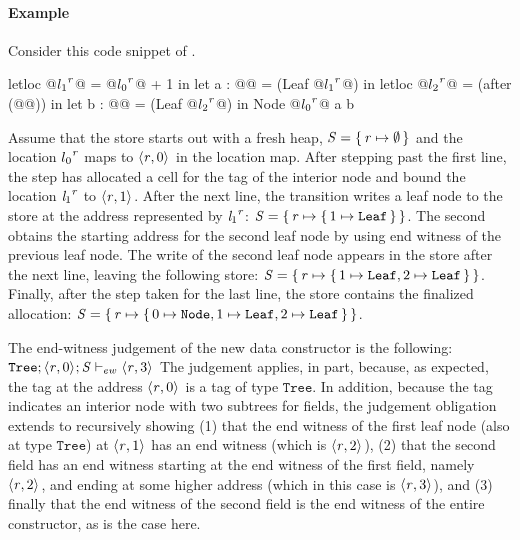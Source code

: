 \paragraph{Example} %
%
Consider this code snippet of \ourcalc{}.
%
\begin{code}
letloc @${l_1}^{\mathit{r}}$@ = @${l_0}^{\mathit{r}}$@ + 1 in
let a : @@ = (Leaf @${l_1}^{\mathit{r}}$@) in
letloc @${l_2}^{\mathit{r}}$@ = (after (@@)) in
let b : @@ = (Leaf @${l_2}^{\mathit{r}}$@) in
Node @${l_0}^{\mathit{r}}$@ a b
\end{code}
%
Assume that the store starts out with a fresh heap, $\mathit{S} = \{ \, \mathit{r}
  \mapsto \emptyset \,\}$ and the location ${l_0}^{\mathit{r}}$ maps to
$\langle \mathit{r}, 0 \rangle ^{}$ in the location map.
%
After stepping past the first line, the \textsc{\dletloctag{}} step has
allocated a cell for the tag of the interior node and bound the
location ${\mathit{l}_1}^{\mathit{r}}$ to $\langle \mathit{r}, 1 \rangle ^{}$.
%
After the next line, the \textsc{\ddatacon{}} transition writes a leaf node to
the store at the address represented by ${\mathit{l}_1}^{\mathit{r}}$:
$\mathit{S} = \{ \, \mathit{r} \mapsto \{ \, 1 \mapsto \mathtt{Leaf} \,\} \,\}$.
%
The second  obtains the starting address for the second
leaf node by using end witness of the previous leaf node.
%
The write of the second leaf node appears in the store after
the next line, leaving the following store:
$
\mathit{S} = \{ \, \mathit{r} \mapsto \{ \, 1 \mapsto \mathtt{Leaf}, 2 \mapsto \mathtt{Leaf} \,\} \,\}$.
%
Finally, after the \textsc{\ddatacon{}} step taken for the last line, the store
contains the finalized allocation:
$\mathit{S} = \{ \, \mathit{r} \mapsto \{ \, 0 \mapsto \mathtt{Node}, 1 \mapsto \mathtt{Leaf}, 2 \mapsto \mathtt{Leaf} \,\} \,\}$.
%

The end-witness judgement of the new data constructor is the
following:
$\mathtt{Tree};\langle \mathit{r}, 0 \rangle ^{};\mathit{S} \vdash_{ew} \langle \mathit{r}, 3 \rangle ^{}$
%
The judgement applies, in part, because, as expected, the tag at the
address $\langle \mathit{r}, 0 \rangle ^{}$ is a tag of type $\mathtt{Tree}$.
%
In addition, because the tag indicates an interior node with two
subtrees for fields, the judgement obligation extends to recursively
showing (1) that the end witness of the first leaf node (also at type
$\mathtt{Tree}$) at $\langle \mathit{r}, 1 \rangle ^{}$ has an end witness
(which is $\langle \mathit{r}, 2 \rangle ^{}$), (2) that the second field has an
end witness starting at the end witness of the first field, namely
$\langle \mathit{r}, 2 \rangle ^{}$, and ending at some higher address (which in
this case is $\langle \mathit{r}, 3 \rangle ^{}$), and (3) finally that the end
witness of the second field is the end witness of the entire
constructor, as is the case here.

